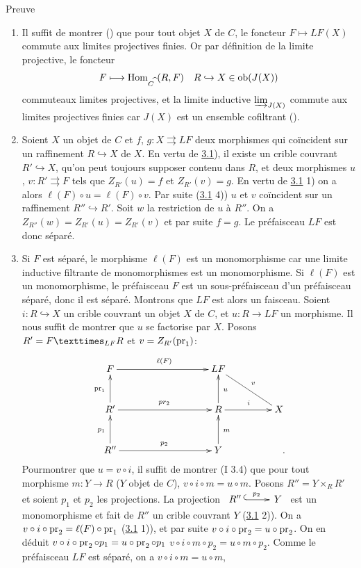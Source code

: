 \documentclass[10pt]{../fichiers-configuration-latex/smfart}
\begin{document}
\begin{enonce*}[remark]{Preuve}
\begin{enumerate}
\renewcommand{\labelenumi}{\theenumi)}
\item Il suffit de montrer () que pour tout objet $X$ de $C$, le
  foncteur $F\mapsto LF(X)$ commute aux limites projectives finies. Or
  par définition de la limite projective, le foncteur
$$
F\longmapsto \operatorname{Hom}_{C^{\widehat{\phantom{,}}}}(R,F)\quad
R\hookrightarrow X\in \operatorname{ob} (J(X))
$$
commute\pageoriginale aux limites projectives, et la limite
inductive $\varinjlim_{J(X)}$ commute aux limites projectives finies
car $J(X)$ est un ensemble cofiltrant ().

\item Soient $X$ un objet de $C$ et $f$, $g:X\rightrightarrows LF$
  deux morphismes qui coïncident sur un raffinement
  $R\hookrightarrow X$ de $X$. En vertu de \hyperref[II.lem3.1]{3.1}), il existe un crible couvrant $R'\hookrightarrow
  X$, qu'on peut toujours supposer contenu dans $R$, et deux
  morphismes $u$, $v:R'\rightrightarrows F$ tels que $Z_{R'}(u)=f$ et
  $Z_{R'}(v)=g$. En vertu de \hyperref[II.lem3.1]{3.1} 1) on a alors $\ell(F)\circ
  u=\ell(F)\circ v$. Par suite (\hyperref[II.lem3.1]{3.1} 4)) $u$ et $v$ coïncident sur un
  raffinement $R''\hookrightarrow R'$. Soit $w$ la
  restriction de $u$ à $R''$. On a $Z_{R''}(w)=Z_{R'}(u)=Z_{R'}(v)$
  et par suite $f=g$. Le préfaisceau $LF$ est donc séparé.

\item Si $F$ est séparé, le morphisme $\ell(F)$ est un
  monomorphisme car une limite inductive filtrante de monomorphismes
  est un monomorphisme. Si $\ell(F)$ est un monomorphisme, le
  préfaisceau $F$ est un sous-préfaisceau d'un préfaisceau
  séparé, donc il est séparé. Montrons que $LF$ est alors un
  faisceau. Soient $i:R\hookrightarrow X$ un crible couvrant un objet
  $X$ de $C$, et $u:R\rightarrow LF$ un morphisme. Il nous suffit de
  montrer que $u$ se factorise par $X$. Posons $R'=\fprod{F}{R}{LF}$ et
  $v=Z_{R'}(\operatorname{pr}_1)$:
\[
\xymatrix@L=5pt@R=1cm@C=1.5cm{
F \ar[rr]^{\ell(F)}               && LF                      &\\
R' \ar[u]^{\pr_1} \ar[rr]^{pr_2}   && R \ar[r]^{i} \ar[u]_{u} & X \ar@{-}[lu]_{v}\\
R''\ar[u]^{p_1} \ar[rr]^{p_2}     && Y  \ar[u]_{m}               &
\quad . }
\]
Pour\pageoriginale montrer que $u=v\circ i$, il suffit de montrer (I
3.4) que pour tout morphisme $m:Y\rightarrow R$ ($Y$ objet de $C$),
$v\circ i\circ m=u\circ m$. Posons $R''=Y\times_R R'$ et soient
$p_1$ et $p_2$ les projections. La projection $\xymatrix@M=5pt{ R''
\ar@{^{(}->}[r]^{p_2}& Y }$ est un monomorphisme et fait de $R''$ un
crible couvrant $Y$ (\hyperref[II.lem3.1]{3.1} 2)). On a $v\circ i\circ
\operatorname{pr}_2=\ell(F)\circ\operatorname{pr}_1$ (\hyperref[II.lem3.1]{3.1} 1)), et par suite $v\circ
i\circ \operatorname{pr}_2=u\circ \operatorname{pr}_2$. On en déduit $v\circ i\circ \operatorname{pr}_2
\circ p_1=u\circ \operatorname{pr}_2 \circ p_1$ \ie $v\circ i\circ m\circ
p_2=u\circ m\circ p_2$. Comme le préfaisceau $LF$ est séparé,
on a $v\circ i\circ m=u\circ m$, \cqfd


\end{enumerate}
\end{enonce*}
\end{document}

